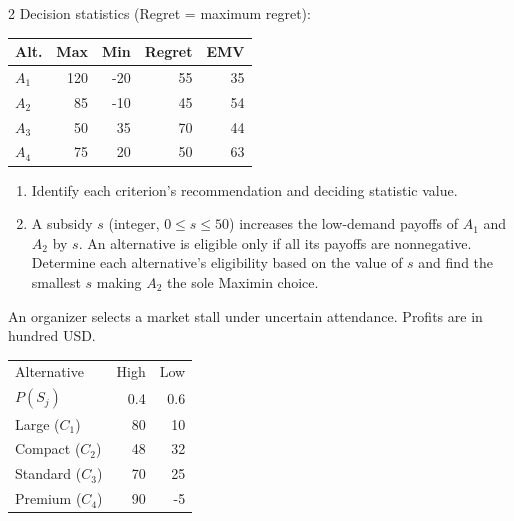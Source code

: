 \begin{multicols}{2}
		Decision statistics (Regret = maximum regret):
		
		\vspace{-3mm}
		\begin{center}\small\setlength{\tabcolsep}{4pt}
			\begin{tabular}{lrrrr}\toprule
				Alt. & Max & Min & Regret & EMV\\ \midrule
				$A_1$ & 120 & -20 & 55 & 35\\
				$A_2$ & 85 & -10 & 45 & 54\\
				$A_3$ & 50 & 35 & 70 & 44\\
				$A_4$ & 75 & 20 & 50 & 63\\
				\bottomrule
			\end{tabular}
		\end{center}
		\vspace{-3mm}
		
		\begin{enumerate}[label=\textbf{(\alph*)},leftmargin=*]
			\item Identify each criterion's recommendation and deciding statistic value. 
			
			\item A subsidy $s$ (integer, $0\leq s\leq50$) increases the low-demand payoffs of $A_1$ and $A_2$ by $s$. An alternative is eligible only if all its payoffs are nonnegative. Determine each alternative's eligibility based on the value of $s$ and find the smallest $s$ making $A_2$ the sole Maximin choice.
		\end{enumerate}
		
		
		
		
		An organizer selects a market stall under uncertain attendance. Profits are in hundred USD.
		
		\begin{center}\small\setlength{\tabcolsep}{4pt}
			\begin{tabular}{lrr}\toprule
				Alternative & High & Low\\
				$P(S_j)$ & 0.4 & 0.6\\ \midrule
				Large ($C_1$) & 80 & 10\\
				Compact ($C_2$) & 48 & 32\\
				Standard ($C_3$) & 70 & 25\\
				Premium ($C_4$) & 90 & -5\\
				\bottomrule
			\end{tabular}
		\end{center} \vspace{-3mm}
		

\end{multicols}
